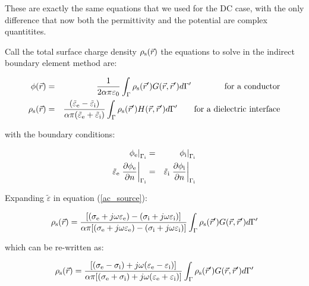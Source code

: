 \documentclass[12pt]{report}
\begin{document}
These are exactly the same equations that we used for the DC case, with the only difference that now both the permittivity and the potential are complex quantitites.

Call the total surface charge density $\rho_{\rm s}(\vec{r})$ the equations to solve in the indirect boundary element method are:

\begin{eqnarray}
\phi(\vec{r})&=&\frac{1}{2\alpha\pi\varepsilon_0}\int_\Gamma{\rho_{\rm s}(\vec{r}^\prime)G(\vec{r},\vec{r}^\prime)d\Gamma^\prime}\qquad\qquad\textrm{for a conductor}\label{ac_pot}\\
\rho_{\rm s}(\vec{r})&=&\frac{(\tilde{\varepsilon}_{\rm e}-\tilde{\varepsilon}_{\rm i})}{\alpha\pi(\tilde{\varepsilon}_{\rm e}+\tilde{\varepsilon}_{\rm i})}\int_\Gamma{\rho_{\rm s}(\vec{r}^\prime)H(\vec{r},\vec{r}^\prime)d\Gamma^\prime}\qquad\textrm{for a dielectric interface}\label{ac_source}\end{eqnarray}

with the boundary conditions:

\begin{eqnarray}
\left.\phi_{\rm e}\right|_{\Gamma_{\rm i}}&=&\left.\phi_{\rm i}\right|_{\Gamma_{\rm i}}\label{ac_bc1}\\
\tilde{\varepsilon}_{\rm e}\left.\frac{\partial\phi_{\rm e}}{\partial n}\right|_{\Gamma_{\rm i}}&=&\tilde{\varepsilon}_{\rm i}\left.\frac{\partial\phi_{\rm i}}{\partial n}\right|_{\Gamma_{\rm i}}\label{ac_bc2}
\end{eqnarray}

Expanding $\tilde{\varepsilon}$ in equation (\ref{ac_source}):

\begin{equation}
\rho_{\rm s}(\vec{r})=\frac{[(\sigma_{\rm e}+j\omega\varepsilon_{\rm e})-(\sigma_{\rm i}+j\omega\varepsilon_{\rm i})]}{\alpha\pi[(\sigma_{\rm e}+j\omega\varepsilon_{\rm e})-(\sigma_{\rm i}+j\omega\varepsilon_{\rm i})]}\int_\Gamma{\rho_{\rm s}(\vec{r}^\prime)G(\vec{r},\vec{r}^\prime)d\Gamma^\prime}
\end{equation}

which can be re-written as:

\begin{equation}
\rho_{\rm s}(\vec{r})=\frac{[(\sigma_{\rm e}-\sigma_{\rm i})+j\omega(\varepsilon_{\rm e}-\varepsilon_{\rm i})]}{\alpha\pi[(\sigma_{\rm e}+\sigma_{\rm i})+j\omega(\varepsilon_{\rm e}+\varepsilon_{\rm i})]}\int_\Gamma{\rho_{\rm s}(\vec{r}^\prime)G(\vec{r},\vec{r}^\prime)d\Gamma^\prime}
\end{equation}
\end{document}

